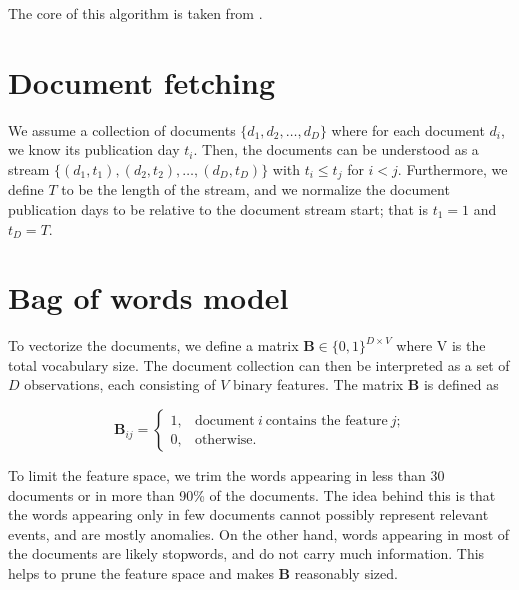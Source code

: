 
The core of this algorithm is taken from \cite{event-detection}.

\section{Document fetching}
We assume a collection of documents $\big\{d_{1}, d_{2}, \dots, d_{D}\big\}$ where for each document $d_{i}$, we know its publication day $t_{i}$. Then, the documents can be understood as a stream $\big\{(d_{1}, t_{1}), (d_{2}, t_{2}), \dots, (d_{D}, t_{D})\big\}$ with $t_{i} \leq t_{j}$ for $i < j$. Furthermore, we define $T$ to be the length of the stream, and we normalize the document publication days to be relative to the document stream start; that is $t_{1} = 1$ and $t_{D} = T$.


\section{Bag of words model}
To vectorize the documents, we define a matrix $\mathbf{B} \in \{0, 1\}^{D \times V}$ where V is the total vocabulary size. The document collection can then be interpreted as a set of $D$ observations, each consisting of $V$ binary features. The matrix $\mathbf{B}$ is defined as

\begin{equation}
	\mathbf{B}_{ij} = \begin{cases}
		1, & \text{document}~i~\text{contains the feature}~j \text{;} \\
		0, & \text{otherwise.}
	\end{cases}
\end{equation}

To limit the feature space, we trim the words appearing in less than 30 documents or in more than 90\% of the documents. The idea behind this is that the words appearing only in few documents cannot possibly represent relevant events, and are mostly anomalies. On the other hand, words appearing in most of the documents are likely stopwords, and do not carry much information. This helps to prune the feature space and makes $\mathbf{B}$ reasonably sized.

